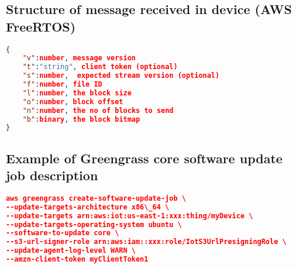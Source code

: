 \documentclass[12pt]{article}
\begin{document}
\subsection{Structure of message received in device (AWS FreeRTOS) \cite{misc03}}
\label{appendix:aws_freeRtosMessage}
\begin{lstlisting}[language=json,firstnumber=1]
{
    "v":number, message version
    "t":"string", client token (optional)
    "s":number,  expected stream version (optional)
    "f":number, file ID
    "l":number, the block size
    "o":number, block offset
    "n":number, the no of blocks to send
    "b":binary, the block bitmap
}
\end{lstlisting}

\subsection{Example of Greengrass core software update job description}
\label{appendix:aws_greengrassCmd}
\begin{lstlisting}[language=json,firstnumber=1]
aws greengrass create-software-update-job \
--update-targets-architecture x86\_64 \
--update-targets arn:aws:iot:us-east-1:xxx:thing/myDevice \
--update-targets-operating-system ubuntu \
--software-to-update core \
--s3-url-signer-role arn:aws:iam::xxx:role/IotS3UrlPresigningRole \
--update-agent-log-level WARN \
--amzn-client-token myClientToken1 	
\end{lstlisting}
\end{document}

